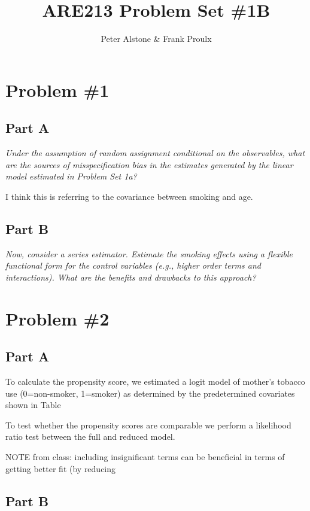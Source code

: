 \documentclass[letterpaper, 12pt]{article}
\begin{document}
\title{ARE213 Problem Set \#1B}
\author{Peter Alstone \& Frank Proulx}
\maketitle

\section{Problem \#1}
\subsection{Part A}
\emph{Under the assumption of random assignment conditional on the observables, what are the sources of misspecification bias in the estimates generated by the linear model estimated in Problem Set 1a?}

I think this is referring to the covariance between smoking and age.




\subsection{Part B}
\emph{Now, consider a series estimator. Estimate the smoking effects using a flexible functional form for the control variables (e.g., higher order terms and interactions). What are the benefits and drawbacks to this approach?}


\section{Problem \#2}
\subsection{Part A}

To calculate the propensity score, we estimated a logit model of mother's tobacco use (0=non-smoker, 1=smoker) as determined by the predetermined covariates shown in Table %



To test whether the propensity scores are comparable we perform a likelihood ratio test between the full and reduced model. 

NOTE from class: including insignificant terms can be beneficial in terms of getting better fit (by reducing 



\subsection{Part B}
\end{document}
